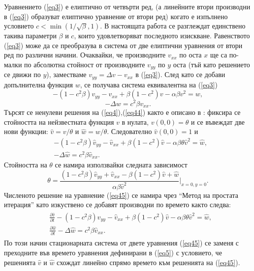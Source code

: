 \documentclass[a4paper]{article}
\newcommand{\rf}[1]{(\ref{#1})}
\theoremstyle{remark}
\begin{document}
Уравнението \rf{eq3} е елиптично от четвърти ред, (а линейните втори производни в \rf{eq3} образуват елиптично уравнение от втори ред) когато е изпълнено условието $c < \min (1/ \sqrt{\beta},1)$. В настоящата работа се разглеждат единствено такива параметри $\beta$ и $c$, които удовлетворяват последното изискване.
Равенството \rf{eq3} може да се преобразува в система от две елиптични уравнения от втори ред по различни начини. Очаквайки, че производните $v_{xx}$ по оста $x$ ще са по-малки по абсолютна стойност от производните $v_{yy}$ по $y$ оста (тъй като решението се движи по $y$), заместваме $v_{yy} = \Delta v- v_{xx}$ в \rf{eq3}. След като се добави допълнителна функция $w$, се получава система еквивалентна на \rf{eq3}
\begin{equation}\label{eq4}
- (1- c^2 \beta) v_{yy} - v_{xx} + \beta (1-c^2) v - \alpha \beta v^2 = w, 
\end{equation}
\begin{equation}\label{eq44}
 - \Delta w = c^2 \beta v_{xx}. 
\end{equation}
Търсят се ненулеви решения на \rf{eq4},\rf{eq44} както е описано в \cite{ref116, ref117}: фиксира се стойността на нейзвестната функция $v$ в нулата, $v(0,0)=\theta$ и се въвеждат две нови функции: $\widehat{v}=v/{\theta} $ и $\widehat{w}=w/{\theta} $. Следователно $\widehat{v}(0,0)=1$ и 
\begin{equation}\label{eq45}
\begin{split}
 &- (1 - c^2 \beta) \widehat{v}_{yy} -\widehat{v}_{xx} + \beta (1-c^2) \widehat{v} - \alpha \beta \theta \widehat{v}^2 = \widehat{w}, \\
 &- \Delta \widehat{w} =  c^2 \beta \widehat{v}_{xx}.
\end{split}
\end{equation}
Стойността на $\theta$ се намира използвайки следната зависимост
\begin{equation}\label{eqtheta}
\theta = \frac{ (1-c^2 \beta) \widehat{v}_{yy} + \widehat{v}_{xx} - \beta (1-c^2) \widehat{v} +\widehat{w}}{\alpha \beta \widehat{v}^2 } |_{x=0,y=0}.
\end{equation}
Численото решение на уравнение \rf{eq45} се намира чрез ``Метод на простата итерация'' като изкуствено се добавят производни по времето както следва:
\begin{align}\label{eq5}
\begin{split}
 &\frac {\partial \widehat{v}}{\partial t} - (1 - c^2 \beta) \widehat{v}_{yy} -\widehat{v}_{xx} + \beta (1-c^2) \widehat{v} - \alpha \beta \theta \widehat{v}^2 = \widehat{w}, \\
 &\frac {\partial \widehat{w}}{\partial t} - \Delta \widehat{w} =  c^2 \beta \widehat{v}_{xx}. 
\end{split}
\end{align}
По този начин стационарната система от двете уравнения \rf{eq45} се заменя с преходните във времето уравнения дефинирани в \rf{eq5} с условието, че решенията $\widehat{v}$ и $\widehat{w}$ схождат линейно спрямо времето към решенията на \rf{eq45}.
\end{document}
